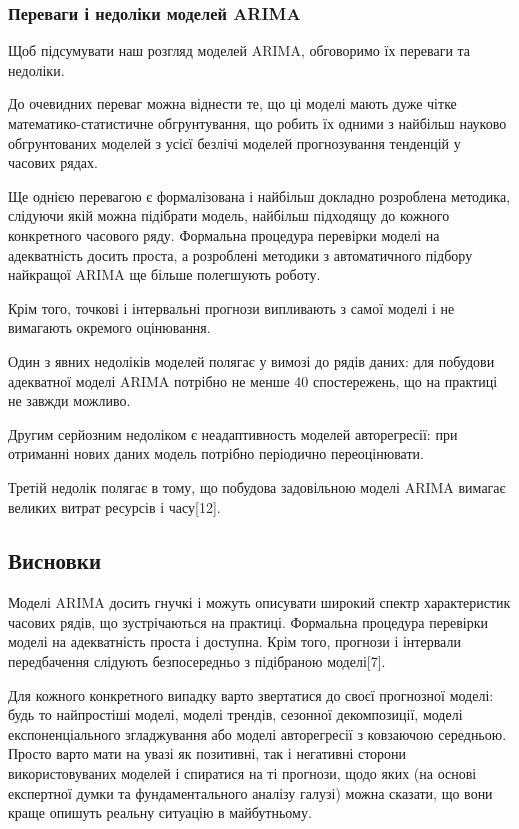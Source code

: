 \subsubsection{Переваги і недоліки моделей ARIMA}

Щоб підсумувати наш розгляд моделей ARIMA, обговоримо їх переваги та недоліки.

До очевидних переваг можна віднести те, що ці моделі мають дуже чітке математико-статистичне обгрунтування, що робить їх одними з найбільш науково обгрунтованих моделей з усієї безлічі моделей прогнозування тенденцій у часових рядах.

Ще однією перевагою є формалізована і найбільш докладно розроблена методика, слідуючи якій можна підібрати модель, найбільш підходящу до кожного конкретного часового ряду. Формальна процедура перевірки моделі на адекватність досить проста, а розроблені методики з автоматичного підбору найкращої ARIMA ще більше полегшують роботу.

Крім того, точкові і інтервальні прогнози випливають з самої моделі і не вимагають окремого оцінювання.

Один з явних недоліків моделей полягає у вимозі до рядів даних: для побудови адекватної моделі ARIMA потрібно не менше 40 спостережень, що на практиці не завжди можливо.

Другим серйозним недоліком є неадаптивность моделей авторегресії: при отриманні нових даних модель потрібно періодично переоцінювати.

Третій недолік полягає в тому, що побудова задовільною моделі ARIMA вимагає великих витрат ресурсів і часу[12].

\subsection{Висновки}

Моделі ARIMA досить гнучкі і можуть описувати широкий спектр характеристик часових рядів, що зустрічаються на практиці. Формальна процедура перевірки моделі на адекватність проста і доступна. Крім того, прогнози і інтервали передбачення слідують безпосередньо з підібраною моделі[7].

Для кожного конкретного випадку варто звертатися до своєї прогнозної моделі: будь то найпростіші моделі, моделі трендів, сезонної декомпозиції, моделі експоненціального згладжування або моделі авторегресії з ковзаючою середньою. Просто варто мати на увазі як позитивні, так і негативні сторони використовуваних моделей і спиратися на ті прогнози, щодо яких (на основі експертної думки та фундаментального аналізу галузі) можна сказати, що вони краще опишуть реальну ситуацію в майбутньому.
